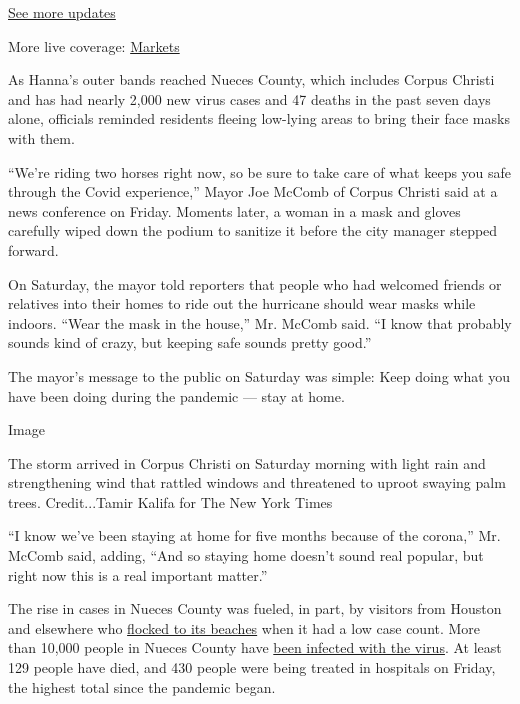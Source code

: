 \href{https://www.nytimes.com/2020/08/01/world/coronavirus-covid-19.html?action=click\&pgtype=Article\&state=default\&region=MAIN_CONTENT_1\&context=storylines_live_updates}{See
more updates}

More live coverage:
\href{https://www.nytimes.com/live/2020/07/31/business/stock-market-today-coronavirus?action=click\&pgtype=Article\&state=default\&region=MAIN_CONTENT_1\&context=storylines_live_updates}{Markets}

As Hanna's outer bands reached Nueces County, which includes Corpus
Christi and has had nearly 2,000 new virus cases and 47 deaths in the
past seven days alone, officials reminded residents fleeing low-lying
areas to bring their face masks with them.

``We're riding two horses right now, so be sure to take care of what
keeps you safe through the Covid experience,'' Mayor Joe McComb of
Corpus Christi said at a news conference on Friday. Moments later, a
woman in a mask and gloves carefully wiped down the podium to sanitize
it before the city manager stepped forward.

On Saturday, the mayor told reporters that people who had welcomed
friends or relatives into their homes to ride out the hurricane should
wear masks while indoors. ``Wear the mask in the house,'' Mr. McComb
said. ``I know that probably sounds kind of crazy, but keeping safe
sounds pretty good.''

The mayor's message to the public on Saturday was simple: Keep doing
what you have been doing during the pandemic --- stay at home.

Image

The storm arrived in Corpus Christi on Saturday morning with light rain
and strengthening wind that rattled windows and threatened to uproot
swaying palm trees. Credit...Tamir Kalifa for The New York Times

``I know we've been staying at home for five months because of the
corona,'' Mr. McComb said, adding, ``And so staying home doesn't sound
real popular, but right now this is a real important matter.''

The rise in cases in Nueces County was fueled, in part, by visitors from
Houston and elsewhere who
\href{https://www.nytimes.com/2020/07/11/us/coronavirus-texas-corpus-christi.html}{flocked
to its beaches} when it had a low case count. More than 10,000 people in
Nueces County have
\href{https://www.nytimes.com/interactive/2020/us/texas-coronavirus-cases.html}{been
infected with the virus}. At least 129 people have died, and 430 people
were being treated in hospitals on Friday, the highest total since the
pandemic began.

